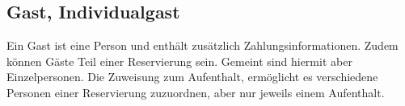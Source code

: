 \documentclass[../../Pflichtenheft.tex]{subfiles}
\begin{document}
    \subsection{Gast, Individualgast}
    Ein Gast ist eine Person und enthält zusätzlich Zahlungsinformationen. Zudem können
    Gäste Teil einer Reservierung sein. Gemeint sind hiermit aber Einzelpersonen.
    Die Zuweisung zum Aufenthalt, ermöglicht es verschiedene Personen einer Reservierung zuzuordnen, aber
    nur jeweils einem Aufenthalt.
\end{document}
